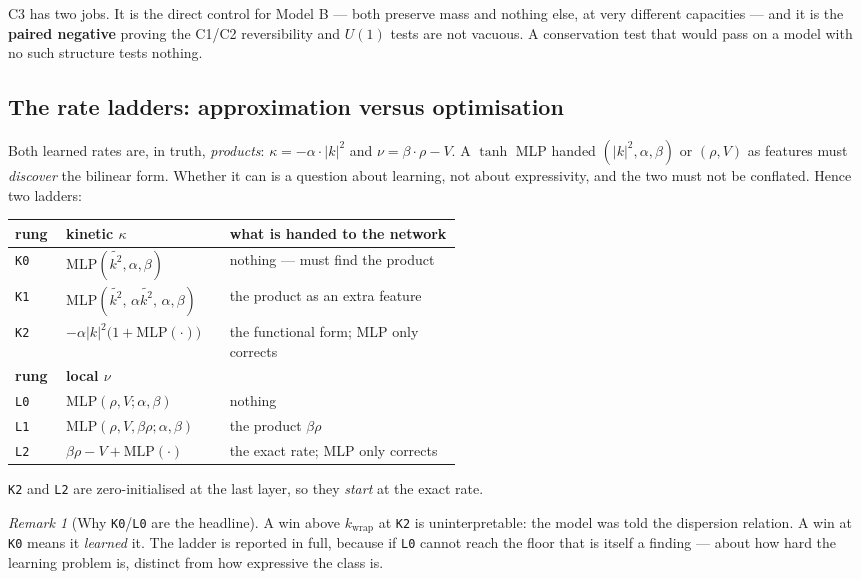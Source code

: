 \documentclass[11pt,a4paper]{article}
\theoremstyle{plain}
\theoremstyle{definition}
\theoremstyle{remark}
\newtheorem{remark}[theorem]{Remark}
\newcommand{\kwrap}{k_{\mathrm{wrap}}}
\newcommand{\code}[1]{\texttt{\small #1}}
\begin{document}
C3 has two jobs. It is the direct control for Model B --- both preserve mass and nothing
else, at very different capacities --- and it is the \textbf{paired negative} proving the
C1/C2 reversibility and $U(1)$ tests are not vacuous. A conservation test that would pass
on a model with no such structure tests nothing.

\subsection{The rate ladders: approximation versus optimisation}
\label{sec:ladders}

Both learned rates are, in truth, \emph{products}: $\kappa = -\alpha\cdot|k|^2$ and
$\nu = \beta\cdot\rho - V$. A $\tanh$ MLP handed $(|k|^2,\alpha,\beta)$ or $(\rho,V)$ as
features must \emph{discover} the bilinear form. Whether it can is a question about
learning, not about expressivity, and the two must not be conflated. Hence two ladders:

\begin{center}
\begin{tabular}{@{}llp{0.52\linewidth}@{}}
\toprule
\textbf{rung} & \textbf{kinetic $\kappa$} & \textbf{what is handed to the network}\\
\midrule
\code{K0} & $\mathrm{MLP}(\widetilde{k^2},\alpha,\beta)$ & nothing --- must find the product\\
\code{K1} & $\mathrm{MLP}(\widetilde{k^2},\,\alpha\widetilde{k^2},\,\alpha,\beta)$ & the product as an extra feature\\
\code{K2} & $-\alpha|k|^2\bigl(1+\mathrm{MLP}(\cdot)\bigr)$ & the functional form; MLP only corrects\\
\midrule
\textbf{rung} & \textbf{local $\nu$} & \\
\midrule
\code{L0} & $\mathrm{MLP}(\rho,V;\alpha,\beta)$ & nothing\\
\code{L1} & $\mathrm{MLP}(\rho,V,\beta\rho;\alpha,\beta)$ & the product $\beta\rho$\\
\code{L2} & $\beta\rho - V + \mathrm{MLP}(\cdot)$ & the exact rate; MLP only corrects\\
\bottomrule
\end{tabular}
\end{center}

\code{K2} and \code{L2} are zero-initialised at the last layer, so they \emph{start} at
the exact rate.

\begin{remark}[Why \code{K0}/\code{L0} are the headline]
A win above $\kwrap$ at \code{K2} is uninterpretable: the model was told the dispersion
relation. A win at \code{K0} means it \emph{learned} it. The ladder is reported in full,
because if \code{L0} cannot reach the floor that is itself a finding --- about how hard
the learning problem is, distinct from how expressive the class is.
\end{remark}
\end{document}
